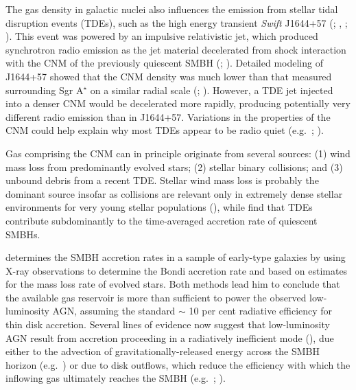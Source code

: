 \documentclass[usenatbib,fleqn]{mn2e}
\newcommand{\Mbh}[1][]{M_{\bullet#1}}
\begin{document}

The gas density in galactic nuclei also influences the emission from
stellar tidal disruption events (TDEs), such as the high energy
transient {\it Swift} J1644+57 (\citealt{Levan+11};
\citealt{Bloom+11}, \citealt{Burrows+11}; \citealt{Zauderer+11}).
This event was powered by an impulsive relativistic jet,
which produced synchrotron radio emission as the jet material
decelerated from shock interaction with the CNM of the previously
quiescent SMBH (\citealt{Giannios&Metzger11}; \citealt{Zauderer+11}).
Detailed modeling of J1644+57 showed that the CNM density was much
lower than that measured surrounding Sgr A$^{\star}$ on a similar radial scale
(\citealt{Metzger+12}; \citealt{BergerZauderer+2012a}).  However, a TDE jet
injected into a denser CNM would be decelerated more rapidly,
producing potentially very different radio emission than in J1644+57.
Variations in the properties of the CNM could help explain why most
TDEs appear to be radio quiet (e.g.~\citealt{Bower+13};
\citealt{VanVelzen+13}).

Gas comprising the CNM can in principle originate from several
sources: (1) wind mass loss from predominantly evolved stars; (2)
stellar binary collisions; and (3) unbound debris from a recent TDE.
Stellar wind mass loss is probably the dominant source insofar as
collisions are relevant only in extremely dense stellar environments
for very young stellar populations (\citealt{Rubin&Loeb11}), while
\citet{MacLeod+13} find that TDEs contribute subdominantly to the
time-averaged accretion rate of quiescent SMBHs.

\citet{Ho:2009a} determines the SMBH accretion rates in a sample of
early-type galaxies by using X-ray observations to determine the
Bondi accretion rate and based on estimates for the mass loss rate of
evolved stars.  Both methods lead him to conclude that the available
gas reservoir is more than sufficient to power the observed
low-luminosity AGN, assuming the standard $\sim$ 10 per cent radiative
efficiency for thin disk accretion.  Several lines of evidence now suggest that low-luminosity AGN result from accretion
proceeding in a radiatively inefficient mode
(\citealt{Yuan&Narayan14}), due either to the advection of
gravitationally-released energy across the SMBH horizon
(e.g.~\citealt{Narayan&Yi95}) or due to disk outflows, which reduce the efficiency with which the inflowing gas ultimately reaches the SMBH (e.g.~\citealt{Blandford&Begelman99}; \citealt{Li+13}).
\end{document}
